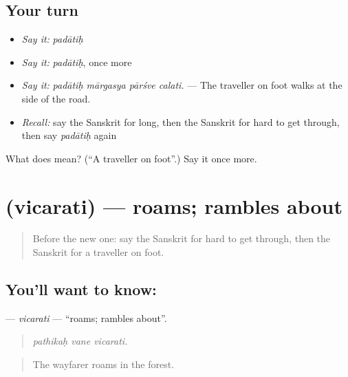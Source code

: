 \subsection*{Your turn}
\begin{itemize}
\raggedright
  \item \emph{Say it:} \emph{padātiḥ}
  \item \emph{Say it:} \emph{padātiḥ}, once more
  \item \emph{Say it:} \emph{padātiḥ mārgasya pārśve calati.} — The traveller on foot walks at the side of the road.
  \item \emph{Recall:} say the Sanskrit for long, then the Sanskrit for hard to get through, then say \emph{padātiḥ} again
\end{itemize}

\begin{tcolorbox}[breakable,colback=teal!4,colframe=teal!35!black,title={Before you move on}]
What does  mean? (\textquotedblleft{}A traveller on foot\textquotedblright{}.) Say it once more.
\end{tcolorbox}
\section[\texorpdfstring{\sk{विचरति} (vicarati)}{विचरति (vicarati)}]{ (vicarati) — roams; rambles about}

\label{lesson:SA-C403-vicarati}



\begin{quote}
Before the new one: say the Sanskrit for hard to get through, then the Sanskrit for a traveller on foot.
\end{quote}

\subsection*{You'll want to know: }
\textbf{} — \emph{vicarati} — \textquotedblleft{}roams; rambles about\textquotedblright{}.

\begin{quote}
  
\end{quote}

\begin{quote}
\emph{pathikaḥ vane vicarati.}
\end{quote}

\begin{quote}
The wayfarer roams in the forest.
\end{quote}

